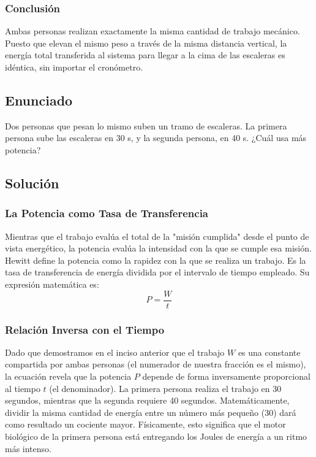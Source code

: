 \documentclass[a4paper,12pt]{article}
\begin{document}
\subsubsection*{Conclusión}
Ambas personas realizan exactamente la misma cantidad de trabajo mecánico. Puesto que elevan el mismo peso a través de la misma distancia vertical, la energía total transferida al sistema para llegar a la cima de las escaleras es idéntica, sin importar el cronómetro.

\newpage
\subsection*{Enunciado}
Dos personas que pesan lo mismo suben un tramo de escaleras. La primera persona sube las escaleras en 30 s, y la segunda persona, en 40 s. 
¿Cuál usa más potencia?

\subsection*{Solución}

\subsubsection*{La Potencia como Tasa de Transferencia}
Mientras que el trabajo evalúa el total de la "misión cumplida" desde el punto de vista energético, la potencia evalúa la intensidad con la que se cumple esa misión. Hewitt define la potencia como la rapidez con la que se realiza un trabajo. Es la tasa de transferencia de energía dividida por el intervalo de tiempo empleado. Su expresión matemática es:
$$P = \frac{W}{t}$$

\subsubsection*{Relación Inversa con el Tiempo}
Dado que demostramos en el inciso anterior que el trabajo $W$ es una constante compartida por ambas personas (el numerador de nuestra fracción es el mismo), la ecuación revela que la potencia $P$ depende de forma inversamente proporcional al tiempo $t$ (el denominador). 
La primera persona realiza el trabajo en 30 segundos, mientras que la segunda requiere 40 segundos. Matemáticamente, dividir la misma cantidad de energía entre un número más pequeño (30) dará como resultado un cociente mayor. Físicamente, esto significa que el motor biológico de la primera persona está entregando los Joules de energía a un ritmo más intenso.
\end{document}
